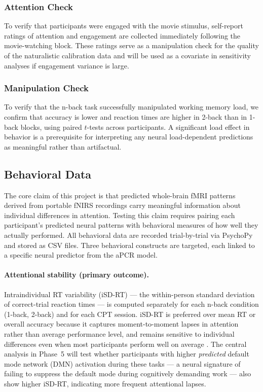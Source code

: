 \subsubsection{Attention Check}

To verify that participants were engaged with the movie stimulus, self-report ratings of attention and engagement are collected immediately following the movie-watching block. These ratings serve as a manipulation check for the quality of the naturalistic calibration data and will be used as a covariate in sensitivity analyses if engagement variance is large.

\subsubsection{Manipulation Check}

To verify that the n-back task successfully manipulated working memory load, we confirm that accuracy is lower and reaction times are higher in 2-back than in 1-back blocks, using paired $t$-tests across participants. A significant load effect in behavior is a prerequisite for interpreting any neural load-dependent predictions as meaningful rather than artifactual.

\subsection{Behavioral Data}

The core claim of this project is that predicted whole-brain fMRI patterns derived from portable fNIRS recordings carry meaningful information about individual differences in attention. Testing this claim requires pairing each participant's predicted neural patterns with behavioral measures of how well they actually performed. All behavioral data are recorded trial-by-trial via PsychoPy and stored as CSV files. Three behavioral constructs are targeted, each linked to a specific neural predictor from the aPCR model.

\paragraph{Attentional stability (primary outcome).} Intraindividual RT variability (iSD-RT) --- the within-person standard deviation of correct-trial reaction times --- is computed separately for each n-back condition (1-back, 2-back) and for each CPT session. iSD-RT is preferred over mean RT or overall accuracy because it captures moment-to-moment lapses in attention rather than average performance level, and remains sensitive to individual differences even when most participants perform well on average \citep{kofler2013, macdonald2009}. The central analysis in Phase~5 will test whether participants with higher \textit{predicted} default mode network (DMN) activation during these tasks --- a neural signature of failing to suppress the default mode during cognitively demanding work --- also show higher iSD-RT, indicating more frequent attentional lapses.

